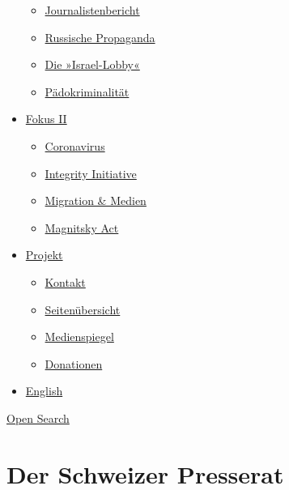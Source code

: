\begin{itemize}
  \begin{itemize}
  \tightlist
  \item
    \href{https://swprs.org/bericht-eines-journalisten/}{Journalistenbericht}
  \item
    \href{https://swprs.org/russische-propaganda/}{Russische Propaganda}
  \item
    \href{https://swprs.org/die-israel-lobby-fakten-und-mythen/}{Die
    »Israel-Lobby«}
  \item
    \href{https://swprs.org/geopolitik-und-paedokriminalitaet/}{Pädokriminalität}
  \end{itemize}
\item
  \href{https://swprs.org/migration-und-medien/}{Fokus II}

  \begin{itemize}
  \tightlist
  \item
    \href{https://swprs.org/covid-19-hinweis-ii/}{Coronavirus}
  \item
    \href{https://swprs.org/die-integrity-initiative/}{Integrity
    Initiative}
  \item
    \href{https://swprs.org/migration-und-medien/}{Migration \& Medien}
  \item
    \href{https://swprs.org/der-fall-magnitsky/}{Magnitsky Act}
  \end{itemize}
\item
  \href{https://swprs.org/kontakt/}{Projekt}

  \begin{itemize}
  \tightlist
  \item
    \href{https://swprs.org/kontakt/}{Kontakt}
  \item
    \href{https://swprs.org/uebersicht/}{Seitenübersicht}
  \item
    \href{https://swprs.org/medienspiegel/}{Medienspiegel}
  \item
    \href{https://swprs.org/donationen/}{Donationen}
  \end{itemize}
\item
  \href{https://swprs.org/contact/}{English}
\end{itemize}

\protect\hyperlink{}{Open Search}

\hypertarget{der-schweizer-presserat}{%
\section{Der Schweizer Presserat}\label{der-schweizer-presserat}}

